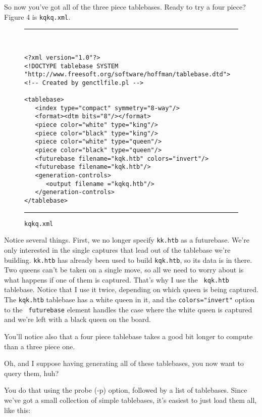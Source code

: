 \documentclass[11pt]{article}
\begin{document}
So now you've got all of the three piece tablebases.  Ready to try a
four piece?  Figure 4 is {\tt kqkq.xml}.

\begin{figure}
\hrule\ 
{\small\begin{verbatim}
<?xml version="1.0"?>
<!DOCTYPE tablebase SYSTEM "http://www.freesoft.org/software/hoffman/tablebase.dtd">
<!-- Created by genctlfile.pl -->

<tablebase>
   <index type="compact" symmetry="8-way"/>
   <format><dtm bits="8"/></format>
   <piece color="white" type="king"/>
   <piece color="black" type="king"/>
   <piece color="white" type="queen"/>
   <piece color="black" type="queen"/>
   <futurebase filename="kqk.htb" colors="invert"/>
   <futurebase filename="kqk.htb"/>
   <generation-controls>
      <output filename ="kqkq.htb"/>
   </generation-controls>
</tablebase>
\end{verbatim}}
\hrule
\caption{\tt kqkq.xml}
\end{figure}

Notice several things.  First, we no longer specify {\tt kk.htb} as a
futurebase.  We're only interested in the single captures that lead
out of the tablebase we're building.  {\tt kk.htb} has already been
used to build {\tt kqk.htb}, so its data is in there.  Two queens
can't be taken on a single move, so all we need to worry about is what
happens if one of them is captured.  That's why I use the {\tt
kqk.htb} tablebase.  Notice that I use it twice, depending on which
queen is being captured.  The {\tt kqk.htb} tablebase has a white
queen in it, and the {\tt colors="invert"} option to the {\tt
futurebase} element handles the case where the white queen is captured
and we're left with a black queen on the board.

You'll notice also that a four piece tablebase takes a good bit longer
to compute than a three piece one.

Oh, and I suppose having generating all of these tablebases, you now
want to query them, huh?

You do that using the probe (-p) option, followed by a list of
tablebases.  Since we've got a small collection of simple tablebases,
it's easiest to just load them all, like this:
\end{document}
